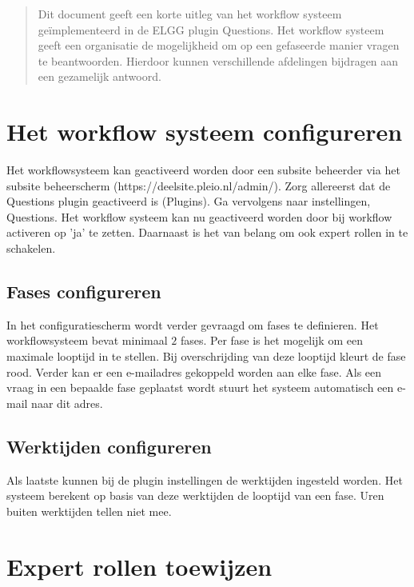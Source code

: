\documentclass[12pt]{article}
\begin{document}
\maketitle

\begin{abstract}
Dit document geeft een korte uitleg van het workflow systeem geïmplementeerd in de ELGG plugin Questions. Het workflow systeem geeft een organisatie de mogelijkheid om op een gefaseerde manier vragen te beantwoorden. Hierdoor kunnen verschillende afdelingen bijdragen aan een gezamelijk antwoord. 
\end{abstract}

\section{Het workflow systeem configureren}
Het workflowsysteem kan geactiveerd worden door een subsite beheerder via het subsite beheerscherm (https://deelsite.pleio.nl/admin/). Zorg allereerst dat de Questions plugin geactiveerd is (Plugins). Ga vervolgens naar instellingen, Questions. Het workflow systeem kan nu geactiveerd worden door bij workflow activeren op 'ja' te zetten. Daarnaast is het van belang om ook expert rollen in te schakelen.

\subsection{Fases configureren}
In het configuratiescherm wordt verder gevraagd om fases te definieren. Het workflowsysteem bevat minimaal $2$ fases. Per fase is het mogelijk om een maximale looptijd in te stellen. Bij overschrijding van deze looptijd kleurt de fase rood. Verder kan er een e-mailadres gekoppeld worden aan elke fase. Als een vraag in een bepaalde fase geplaatst wordt stuurt het systeem automatisch een e-mail naar dit adres. 

\subsection{Werktijden configureren}
Als laatste kunnen bij de plugin instellingen de werktijden ingesteld worden. Het systeem berekent op basis van deze werktijden de looptijd van een fase. Uren buiten werktijden tellen niet mee. 

\section{Expert rollen toewijzen}
\end{document}
